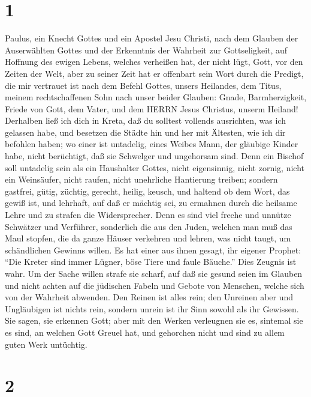 \hypertarget{section}{%
\section{1}\label{section}}

 Paulus, ein Knecht Gottes und ein Apostel Jesu Christi,
nach dem Glauben der Auserwählten Gottes und der Erkenntnis der Wahrheit
zur Gottseligkeit,  auf Hoffnung des ewigen Lebens, welches
verheißen hat, der nicht lügt, Gott, vor den Zeiten der Welt,
 aber zu seiner Zeit hat er offenbart sein Wort durch die
Predigt, die mir vertrauet ist nach dem Befehl Gottes, unsers Heilandes,
 dem Titus, meinem rechtschaffenen Sohn nach unser beider
Glauben: Gnade, Barmherzigkeit, Friede von Gott, dem Vater, und dem
HERRN Jesus Christus, unserm Heiland!  Derhalben ließ ich
dich in Kreta, daß du solltest vollends ausrichten, was ich gelassen
habe, und besetzen die Städte hin und her mit Ältesten, wie ich dir
befohlen haben;  wo einer ist untadelig, eines Weibes Mann,
der gläubige Kinder habe, nicht berüchtigt, daß sie Schwelger und
ungehorsam sind.  Denn ein Bischof soll untadelig sein als
ein Haushalter Gottes, nicht eigensinnig, nicht zornig, nicht ein
Weinsäufer, nicht raufen, nicht unehrliche Hantierung treiben;
 sondern gastfrei, gütig, züchtig, gerecht, heilig, keusch,
 und haltend ob dem Wort, das gewiß ist, und lehrhaft, auf
daß er mächtig sei, zu ermahnen durch die heilsame Lehre und zu strafen
die Widersprecher.  Denn es sind viel freche und unnütze
Schwätzer und Verführer, sonderlich die aus den Juden, 
welchen man muß das Maul stopfen, die da ganze Häuser verkehren und
lehren, was nicht taugt, um schändlichen Gewinns willen. 
Es hat einer aus ihnen gesagt, ihr eigener Prophet: ``Die Kreter sind
immer Lügner, böse Tiere und faule Bäuche.''  Dies Zeugnis
ist wahr. Um der Sache willen strafe sie scharf, auf daß sie gesund
seien im Glauben  und nicht achten auf die jüdischen Fabeln
und Gebote von Menschen, welche sich von der Wahrheit abwenden.
 Den Reinen ist alles rein; den Unreinen aber und
Ungläubigen ist nichts rein, sondern unrein ist ihr Sinn sowohl als ihr
Gewissen.  Sie sagen, sie erkennen Gott; aber mit den
Werken verleugnen sie es, sintemal sie es sind, an welchen Gott Greuel
hat, und gehorchen nicht und sind zu allem guten Werk untüchtig.

\hypertarget{section-1}{%
\section{2}\label{section-1}}

